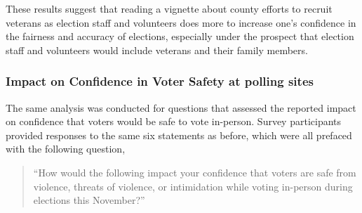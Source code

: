 \documentclass[
  11pt,
  a4paper,
]{article}
\begin{document}
\begin{table}

\caption{\label{tbl-4}Confidence Impact on Election Fairness and
Accuracy}


\end{table}%

These results suggest that reading a vignette about county efforts to
recruit veterans as election staff and volunteers does more to increase
one's confidence in the fairness and accuracy of elections, especially
under the prospect that election staff and volunteers would include
veterans and their family members.

\subsubsection{Impact on Confidence in Voter Safety at polling
sites}\label{impact-on-confidence-in-voter-safety-at-polling-sites}

The same analysis was conducted for questions that assessed the reported
impact on confidence that voters would be safe to vote in-person. Survey
participants provided responses to the same six statements as before,
which were all prefaced with the following question,

\begin{quote}
``How would the following impact your confidence that voters are safe
from violence, threats of violence, or intimidation while voting
in-person during elections this November?''
\end{quote}
\end{document}

